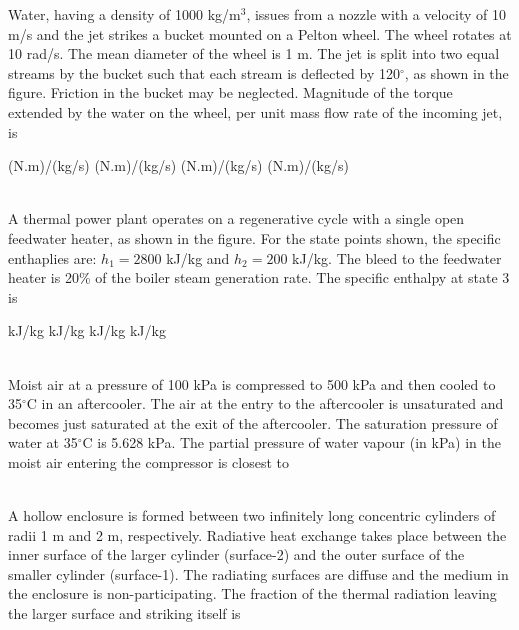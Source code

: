 \documentclass[addpoints,11pt]{exam}
\begin{document}
\begin{questions}
        \question Water, having a density of 1000 kg/m$^3$, issues from a nozzle with a velocity of 10 m/s and the jet strikes a bucket mounted on a Pelton wheel. The wheel rotates at 10 rad/s. The mean diameter of the wheel is 1 m. The jet is split into two equal streams by the bucket such that each stream is deflected by 120$^\circ$, as shown in the figure. Friction in the bucket may be neglected. Magnitude of the torque extended by the water on the wheel, per unit mass flow rate of the incoming jet, is%

        \begin{oneparchoices}
             (N.m)/(kg/s)
             (N.m)/(kg/s)
             (N.m)/(kg/s)
             (N.m)/(kg/s)
        \end{oneparchoices}\\

        \question A thermal power plant operates on a regenerative cycle with a single open feedwater heater, as shown in the figure. For the state points shown, the specific enthaplies are: $h_1 = 2800$ kJ/kg and $h_2 = 200$ kJ/kg. The bleed to the feedwater heater is 20\% of the boiler steam generation rate. The specific enthalpy at state 3 is%

        \begin{oneparchoices}
             kJ/kg
             kJ/kg
             kJ/kg
             kJ/kg
        \end{oneparchoices}\\

        \question Moist air at a pressure of 100 kPa is compressed to 500 kPa and then cooled to 35$^\circ$C in an aftercooler. The air at the entry to the aftercooler is unsaturated and becomes just saturated at the exit of the aftercooler. The saturation pressure of water at 35$^\circ$C is 5.628 kPa. The partial pressure of water vapour (in kPa) in the moist air entering the compressor is closest to\\

        \begin{oneparchoices}
        \end{oneparchoices}\\

        \question A hollow enclosure is formed between two infinitely long concentric cylinders of radii 1 m and 2 m, respectively. Radiative heat exchange takes place between the inner surface of the larger cylinder (surface-2) and the outer surface of the smaller cylinder (surface-1). The radiating surfaces are diffuse and the medium in the enclosure is non-participating. The fraction of the thermal radiation leaving the larger surface and striking itself is%


\end{questions}
\end{document}
